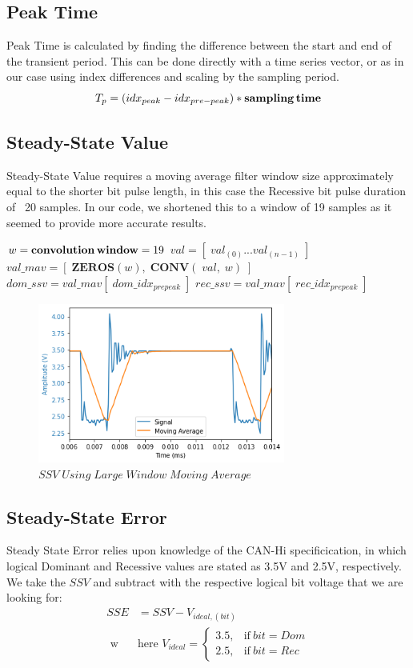 \documentclass[conference]{IEEEtran}
\begin{document}
\subsection{Peak Time}
Peak Time is calculated by finding the difference between the start and end of the transient period. This can be done directly with a time series vector, or as in our case using index differences and scaling by the sampling period.
\begin{equation*}
T_p = (idx_{peak} - idx_{pre-peak}) * \textbf{sampling\,time}   
\end{equation*}

\subsection{Steady-State Value} \label{sec:SSV}
Steady-State Value requires a moving average filter window size approximately equal to the shorter bit pulse length, in this case the Recessive bit pulse duration of ~20 samples. In our code, we shortened this to a window of 19 samples as it seemed to provide more accurate results.
\medbreak
\begin{algorithmic}
\STATE $w = \textbf{convolution\,window} = 19$
\STATE $val = [\;val_{(0)} ... val_{(n-1)}\;] $
\STATE $val\_mav = [\;\textbf{ZEROS}(w),\;\textbf{CONV}(\;val,\;w)\;] $
\STATE $dom\_ssv = val\_mav[\;dom\_idx_{prepeak}\;]$
\STATE $rec\_ssv = val\_mav[\;rec\_idx_{prepeak}\;]$
\end{algorithmic}
\medbreak

\begin{figure}[htb]
\centering
\includegraphics[width=3.2in]{figures/52_ssv.png}
\caption{$SSV\;Using\;Large\;Window\;Moving\;Average$}
\label{fig:SSV}
\end{figure}


\subsection{Steady-State Error} \label{sec:SSE}
Steady State Error relies upon knowledge of the CAN-Hi specificication, in which logical Dominant and Recessive values are stated as 3.5V and 2.5V, respectively. We take the $SSV$ and subtract with the respective logical bit voltage that we are looking for:
\begin{align*}
SSE &= SSV - V_{ideal,(bit)} \\ \text{ w} & \text{here } V_{ideal} =
    \begin{cases}
      3.5, & \text{if}\ bit=Dom \\
      2.5, & \text{if}\ bit=Rec 
    \end{cases}
\end{align*}
\end{document}
